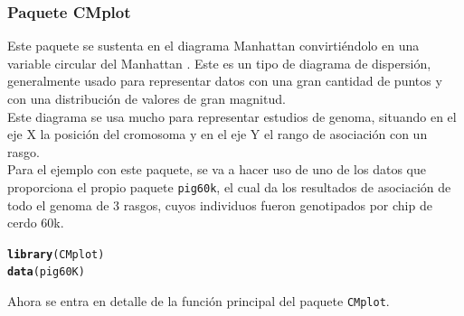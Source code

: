 \documentclass{article}\usepackage[]{graphicx}\usepackage[]{color}
\makeatletter
\newcommand{\hlstd}[1]{\textcolor[rgb]{0.345,0.345,0.345}{#1}}%
\newcommand{\hlkwd}[1]{\textcolor[rgb]{0.737,0.353,0.396}{\textbf{#1}}}%
\newenvironment{kframe}{%
 \def\at@end@of@kframe{}%
 \ifinner\ifhmode%
  \def\at@end@of@kframe{\end{minipage}}%
  \begin{minipage}{\columnwidth}%
 \fi\fi%
 \def\FrameCommand##1{\hskip\@totalleftmargin \hskip-\fboxsep
 \colorbox{shadecolor}{##1}\hskip-\fboxsep
     \hskip-\linewidth \hskip-\@totalleftmargin \hskip\columnwidth}%
 \MakeFramed {\advance\hsize-\width
   \@totalleftmargin\z@ \linewidth\hsize
   \@setminipage}}%
 {\par\unskip\endMakeFramed%
 \at@end@of@kframe}
\newenvironment{knitrout}{}{} %
\makeatother
\begin{document}
\subsubsection{Paquete CMplot}
Este paquete se sustenta en el diagrama Manhattan convirti\'endolo en una variable circular del Manhattan\cite{docu_CMplot}
. Este es un tipo de diagrama de dispersi\'on, generalmente usado para representar datos con una gran cantidad de puntos y con una distribuci\'on de valores de gran magnitud.~\\
Este diagrama se usa mucho para representar estudios de genoma, situando en el eje X la posici\'on del cromosoma y en el eje Y el rango de asociaci\'on con un rasgo.~\\
Para el ejemplo con este paquete, se va a hacer uso de uno de los datos que proporciona el propio paquete \texttt{pig60k}, el cual da los resultados de asociaci\'on de todo el genoma de 3 rasgos, cuyos individuos fueron genotipados por chip de cerdo 60k.
\begin{knitrout}
\color{fgcolor}\begin{kframe}
\begin{alltt}
\hlkwd{library}\hlstd{(CMplot)}
\hlkwd{data}\hlstd{(pig60K)}
\end{alltt}
\end{kframe}
\end{knitrout}
\clearpage
Ahora se entra en detalle de la funci\'on principal del paquete \texttt{CMplot}.
\end{document}
